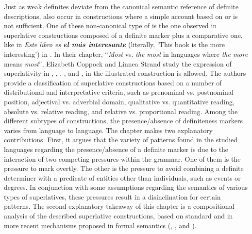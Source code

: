 \documentclass[output=paper]{langsci/langscibook}
\begin{document}
Just as weak definites deviate from the canonical semantic reference of definite descriptions,  also occur in constructions where a simple account based on  or  is not sufficient. One of these non-canonical type of  is the one observed in superlative constructions composed of a definite marker plus a comparative one, like in \textit{Este libro es \textbf{el más interesante}} (literally, ‘This book is the more interesting’) in . In their chapter, “\textit{Most} vs. \textit{the most} in languages where \textit{the more} means \textit{most}”, Elizabeth Coppock and Linnea Strand study the expression of superlativity in , , , , and , in the illustrated construction is allowed. The authors provide a classification of superlative constructions based on a number of distributional and interpretative criteria, such as prenominal vs. postnominal position, adjectival vs. adverbial domain, qualitative vs. quantitative reading, absolute vs. relative reading, and relative vs. proportional reading. Among the different subtypes of constructions, the presence/absence of definiteness markers varies from language to language. The chapter makes two explanatory contributions. First, it argues that the variety of patterns found in the studied languages regarding the presence/absence of a definite marker is due to the interaction of two competing pressures within the grammar. One of them is the pressure to mark  overtly. The other is the pressure to avoid combining a definite determiner with a predicate of entities other than individuals, such as events or degrees. In conjunction with some assumptions regarding the semantics of various types of superlatives, these pressures result in a disinclination for certain patterns. The second explanatory takeaway of this chapter is a compositional analysis of the described superlative constructions, based on standard and in more recent mechanisms proposed in formal semantics (, , and ).
\end{document}
